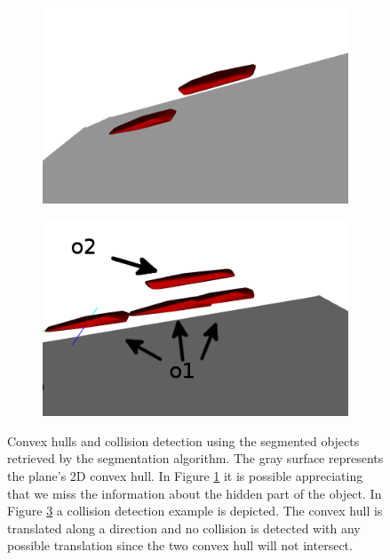 \begin{figure}[h]
\centering
\begin{subfigure}[t]{0.45\textwidth}
\centering
\includegraphics[width=\textwidth]{Img/convexhull/cv_top.png}
\caption{}\label{fig:cv_top}
\end{subfigure}
\begin{subfigure}[t]{0.45\textwidth}
\centering
\includegraphics[width=\textwidth]{Img/convexhull/cv_top_collision.png}
\caption{}\label{fig:cv_top_collision}
\end{subfigure}
\caption{Convex hulls and collision detection using the segmented objects retrieved by the  segmentation algorithm. The gray surface represents the plane's 2D convex hull. In Figure \ref{fig:cv_top} it is possible appreciating that we miss the information about the hidden part of the object. In Figure \ref{fig:cv_top_collision} a collision detection example is depicted. The convex hull is translated along a direction and no collision is detected with any possible translation since the two convex hull will not intersect.}
\end{figure}

